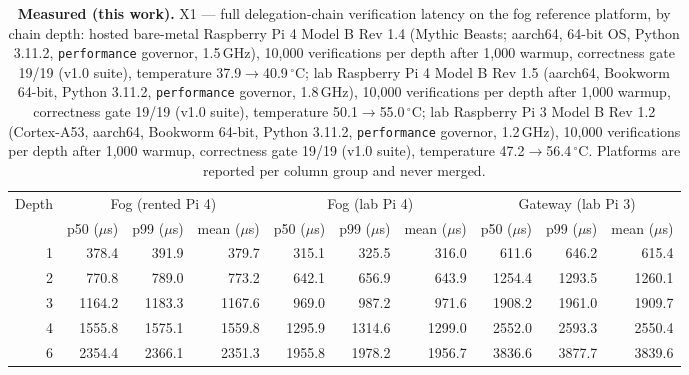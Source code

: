\begin{table}[htbp]
\centering
\caption{\textbf{Measured (this work).} X1 --- full delegation-chain verification latency on the fog reference platform, by chain depth: hosted bare-metal Raspberry Pi 4 Model B Rev 1.4 (Mythic Beasts; aarch64, 64-bit OS, Python 3.11.2, \texttt{performance} governor, 1.5\,GHz), 10{,}000 verifications per depth after 1{,}000 warmup, correctness gate 19/19 (v1.0 suite), temperature 37.9$\rightarrow$40.9\,$^{\circ}$C; lab Raspberry Pi 4 Model B Rev 1.5 (aarch64, Bookworm 64-bit, Python 3.11.2, \texttt{performance} governor, 1.8\,GHz), 10{,}000 verifications per depth after 1{,}000 warmup, correctness gate 19/19 (v1.0 suite), temperature 50.1$\rightarrow$55.0\,$^{\circ}$C; lab Raspberry Pi 3 Model B Rev 1.2 (Cortex-A53, aarch64, Bookworm 64-bit, Python 3.11.2, \texttt{performance} governor, 1.2\,GHz), 10{,}000 verifications per depth after 1{,}000 warmup, correctness gate 19/19 (v1.0 suite), temperature 47.2$\rightarrow$56.4\,$^{\circ}$C. Platforms are reported per column group and never merged.}
\label{tab:bench-verify}
\begin{tabular}{r rrr rrr rrr}
\toprule
Depth & \multicolumn{3}{c}{Fog (rented Pi 4)} & \multicolumn{3}{c}{Fog (lab Pi 4)} & \multicolumn{3}{c}{Gateway (lab Pi 3)} \\
 & p50 ($\mu$s) & p99 ($\mu$s) & mean ($\mu$s) & p50 ($\mu$s) & p99 ($\mu$s) & mean ($\mu$s) & p50 ($\mu$s) & p99 ($\mu$s) & mean ($\mu$s) \\
\midrule
1 & 378.4 & 391.9 & 379.7 & 315.1 & 325.5 & 316.0 & 611.6 & 646.2 & 615.4 \\
2 & 770.8 & 789.0 & 773.2 & 642.1 & 656.9 & 643.9 & 1254.4 & 1293.5 & 1260.1 \\
3 & 1164.2 & 1183.3 & 1167.6 & 969.0 & 987.2 & 971.6 & 1908.2 & 1961.0 & 1909.7 \\
4 & 1555.8 & 1575.1 & 1559.8 & 1295.9 & 1314.6 & 1299.0 & 2552.0 & 2593.3 & 2550.4 \\
6 & 2354.4 & 2366.1 & 2351.3 & 1955.8 & 1978.2 & 1956.7 & 3836.6 & 3877.7 & 3839.6 \\
\bottomrule
\end{tabular}
\end{table}
